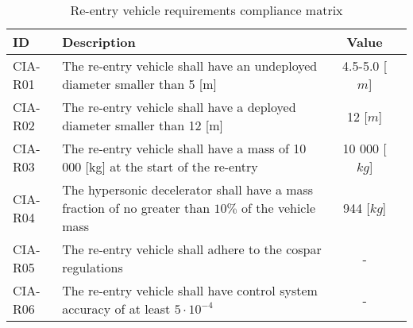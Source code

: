 \begin{table}[H]
\centering
	\caption{Re-entry vehicle requirements compliance matrix} 
	\label{tab:compv}
	\begin{tabular}{|p{}|p{}|c|c|}
	    \hline
	    ID          & Description   & Value &                                                                                           \\ \hline \hline
	CIA-R01 & The re-entry vehicle shall have an undeployed diameter smaller than 5 [m]                   & 4.5-5.0 [$m$]  & \cmark     				            \\ \hline
	CIA-R02 & The re-entry vehicle shall have a deployed diameter smaller than 12 [m]                     & 12 [$m$] &  \cmark 				            \\ \hline	
	CIA-R03 & The re-entry vehicle shall have a mass of 10 000 [kg] at the start of the re-entry           & 10 000 [$kg$] &  \cmark          				            \\ \hline
	CIA-R04 & The hypersonic decelerator shall have a mass fraction of no greater than $10\%$ of the vehicle mass	& 944 [$kg$] & \cmark \\ \hline 
	CIA-R05 &  The re-entry vehicle shall adhere to the \gls{cospar} regulations  & - & \cmark \\ \hline
	CIA-R06 &  The re-entry vehicle shall have control system accuracy of at least $5\cdot 10^{-4}$ & - & \cmark \\ \hline
    \end{tabular}
\end{table}


